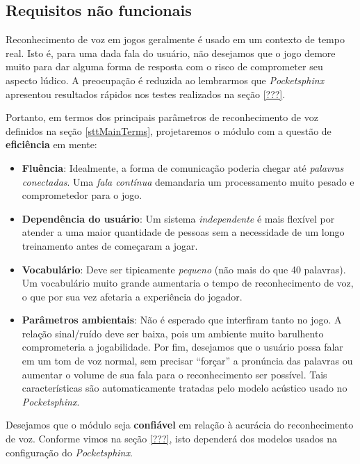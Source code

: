 \subsection{Requisitos não funcionais}


Reconhecimento de voz em jogos geralmente é usado em um contexto de tempo real. Isto é, para uma dada fala do usuário, não desejamos que o jogo demore muito para dar alguma forma de resposta com o risco de comprometer seu aspecto lúdico. A preocupação é reduzida ao lembrarmos que \textit{Pocketsphinx} apresentou resultados rápidos nos testes realizados na seção \ref{???}.

Portanto, em termos dos principais parâmetros de reconhecimento de voz definidos na seção \ref{sttMainTerms}, projetaremos o módulo com a questão de \textbf{eficiência} em mente:

\begin{itemize}
\item \textbf{Fluência}: Idealmente, a forma de comunicação poderia chegar até \emph{palavras conectadas}. Uma \textit{fala contínua} demandaria um processamento muito pesado e comprometedor para o jogo.

\item \textbf{Dependência do usuário}: Um sistema \emph{independente} é mais flexível por atender a uma maior quantidade de pessoas sem a necessidade de um longo treinamento antes de começaram a jogar.

\item \textbf{Vocabulário}: Deve ser tipicamente \emph{pequeno} (não mais do que 40 palavras). Um vocabulário muito grande aumentaria o tempo de reconhecimento de voz, o que por sua vez afetaria a experiência do jogador.

\item \textbf{Parâmetros ambientais}: Não é esperado que interfiram tanto no jogo. A relação sinal/ruído deve ser baixa, pois um ambiente muito barulhento comprometeria a jogabilidade. Por fim, desejamos que o usuário possa falar em um tom de voz normal, sem precisar ``forçar'' a pronúncia das palavras ou aumentar o volume de sua fala para o reconhecimento ser possível. Tais características são automaticamente tratadas pelo modelo acústico usado no \textit{Pocketsphinx}.
\end{itemize}

Desejamos que o módulo seja \textbf{confiável} em relação à acurácia do reconhecimento de voz. Conforme vimos na seção \ref{???}, isto dependerá dos modelos usados na configuração do \textit{Pocketsphinx}.

